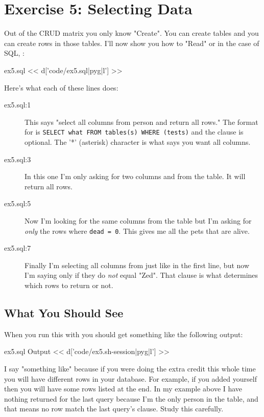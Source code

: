 \chapter{Exercise 5: Selecting Data}

Out of the CRUD matrix you only know "Create".  You can create tables and you
can create rows in those tables.  I'll now show you how to "Read" or in the
case of SQL, :


\begin{code}{ex5.sql}
<< d['code/ex5.sql|pyg|l'] >>
\end{code}

Here's what each of these lines does:

\begin{description}
\item[ex5.sql:1] This says "select all columns from person and return all rows."
    The format for  is \verb|SELECT what FROM tables(s) WHERE (tests)|
    and the  clause is optional.  The '*' (asterisk) character is
    what says you want all columns.
\item[ex5.sql:3] In this one I'm only asking for two columns  and
     from the  table.  It will return all rows.
\item[ex5.sql:5] Now I'm looking for the same columns from the  table
    but I'm asking for \emph{only} the rows where \verb|dead = 0|.  This gives
    me all the pets that are alive.
\item[ex5.sql:7] Finally I'm selecting all columns from  just
    like in the first line, but now I'm saying only if they do \emph{not}
    equal "Zed".  That  clause is what determines which rows
    to return or not.
\end{description}

\section{What You Should See}

When you run this with  you should get something like
the following output:

\begin{code}{ex5.sql Output}
<< d['code/ex5.sh-session|pyg|l'] >>
\end{code}

I say "something like" because if you were doing the extra credit this
whole time you will have different rows in your database.  For example,
if you added yourself then you will have some rows listed at the end.  In
my example above I have nothing returned for the last query because I'm
the only person in the  table, and that means no row
match the last query's  clause.  Study this carefully.

